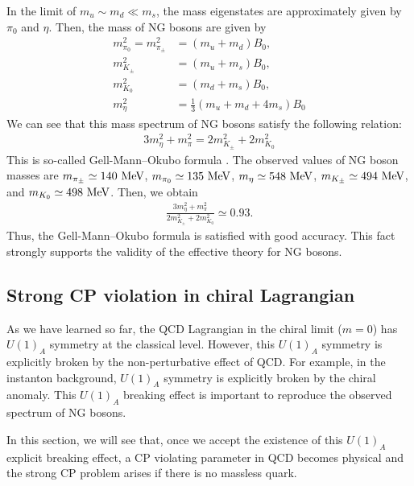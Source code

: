 \documentclass[11pt,a4paper]{article}
\begin{document}
In the limit of $m_u \sim m_d \ll m_s$, the mass eigenstates are approximately given by $\pi_0$ and $\eta$. Then, the mass of NG bosons are given by
\begin{align}
    m_{\pi_0}^2 = m_{\pi_\pm}^2 &= (m_u + m_d)B_0, \\
    m_{K_\pm}^2 &= (m_u + m_s)B_0, \\
    m_{K_0}^2 &= (m_d + m_s)B_0, \\
    m_{\eta}^2 &= \frac{1}{3}(m_u + m_d + 4 m_s)B_0
\end{align}
We can see that this mass spectrum of NG bosons satisfy the following relation:
\begin{align}
    3m_\eta^2 + m_\pi^2 = 2 m_{K_\pm}^2 + 2 m_{K_0}^2
\end{align}
This is so-called Gell-Mann--Okubo formula \cite{Gell-Mann:1961omu, Okubo:1961jc,Okubo:1962zzc}.
The observed values of NG boson masses are
$m_{\pi_\pm} \simeq 140~{\rm MeV}$, 
$m_{\pi_0} \simeq 135~{\rm MeV}$, 
$m_{\eta} \simeq 548~{\rm MeV}$, 
$m_{K_\pm} \simeq 494~{\rm MeV}$, 
and $m_{K_0} \simeq 498~{\rm MeV}$. Then, we obtain
\begin{align}
    \frac{3m_\eta^2 + m_\pi^2 }{ 2 m_{K_\pm}^2 + 2 m_{K_0}^2} \simeq 0.93.
\end{align}
Thus, the Gell-Mann--Okubo formula is satisfied with good accuracy. This fact strongly supports the validity of the effective theory for NG bosons.




\subsection{Strong CP violation in chiral Lagrangian}
As we have learned so far, the QCD Lagrangian in the chiral limit ($m=0$) has $U(1)_A$ symmetry at the classical level.
However, this $U(1)_A$ symmetry is explicitly broken by the non-perturbative effect of QCD. For example, in the instanton background, $U(1)_A$ symmetry is explicitly broken by the chiral anomaly.
This $U(1)_A$ breaking effect is important to reproduce the observed spectrum of NG bosons.

In this section, we will see that, once we accept the existence of this $U(1)_A$ explicit breaking effect, a CP violating parameter in QCD becomes physical and the strong CP problem arises if there is no massless quark.
\end{document}
